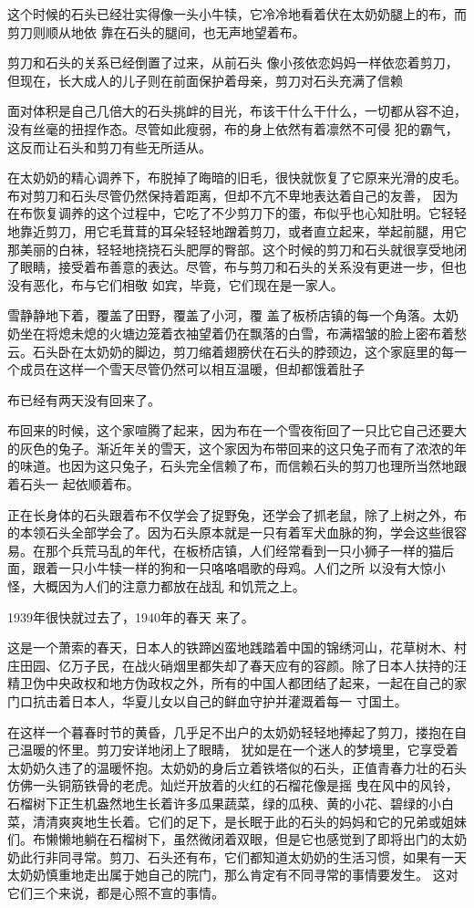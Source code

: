 \documentclass{article}
\begin{document}
这个时候的石头已经壮实得像一头小牛犊，它冷冷地看着伏在太奶奶腿上的布，而剪刀则顺从地依
靠在石头的腿间，也无声地望着布。 

剪刀和石头的关系已经倒置了过来，从前石头
\newpage
像小孩依恋妈妈一样依恋着剪刀，但现在，长大成人的儿子则在前面保护着母亲，剪刀对石头充满了信赖

面对体积是自己几倍大的石头挑衅的目光，布该干什么干什么，一切都从容不迫，没有丝毫的扭捏作态。尽管如此瘦弱，布的身上依然有着凛然不可侵
犯的霸气，这反而让石头和剪刀有些无所适从。 

在太奶奶的精心调养下，布脱掉了晦暗的旧毛，很快就恢复了它原来光滑的皮毛。布对剪刀和石头尽管仍然保持着距离，但却不亢不卑地表达着自己的友善， 因为在布恢复调养的这个过程中，它吃了不少剪刀下的蛋，布似乎也心知肚明。它轻轻地靠近剪刀，用它毛茸茸的耳朵轻轻地蹭着剪刀，或者直立起来，举起前腿，用它那美丽的白袜，轻轻地挠挠石头肥厚的臀部。这个时候的剪刀和石头就很享受地闭了眼睛，接受着布善意的表达。尽管，布与剪刀和石头的关系没有更进一步，但也没有恶化，布与它们相敬
如宾，毕竟，它们现在是一家人。 

雪静静地下着，覆盖了田野，覆盖了小河，覆
\newpage
盖了板桥店镇的每一个角落。太奶奶坐在将熄未熄的火塘边笼着衣袖望着仍在飘落的白雪，布满褶皱的脸上密布着愁云。石头卧在太奶奶的脚边，剪刀缩着翅膀伏在石头的脖颈边，这个家庭里的每一个成员在这样一个雪天尽管仍然可以相互温暖，但却都饿着肚子


布已经有两天没有回来了。 

布回来的时候，这个家喧腾了起来，因为布在一个雪夜衔回了一只比它自己还要大的灰色的兔子。渐近年关的雪天，这个家因为布带回来的这只兔子而有了浓浓的年的味道。也因为这只兔子，石头完全信赖了布，而信赖石头的剪刀也理所当然地跟着石头一
起依顺着布。 

正在长身体的石头跟着布不仅学会了捉野兔，还学会了抓老鼠，除了上树之外，布的本领石头全部学会了。因为石头原本就是一只有着军犬血脉的狗，学会这些很容易。在那个兵荒马乱的年代，在板桥店镇，人们经常看到一只小狮子一样的猫后面，跟着一只小牛犊一样的狗和一只咯咯唱歌的母鸡。人们之所
\newpage
以没有大惊小怪，大概因为人们的注意力都放在战乱
和饥荒之上。 

1939年很快就过去了，1940年的春天
来了。 


这是一个萧索的春天，日本人的铁蹄凶蛮地践踏着中国的锦绣河山，花草树木、村庄田园、亿万子民，在战火硝烟里都失却了春天应有的容颜。除了日本人扶持的汪精卫伪中央政权和地方伪政权之外，所有的中国人都团结了起来，一起在自己的家门口抗击着日本人，华夏儿女以自己的鲜血守护并灌溉着每一
寸国土。 

在这样一个暮春时节的黄昏，几乎足不出户的太奶奶轻轻地捧起了剪刀，搂抱在自己温暖的怀里。剪刀安详地闭上了眼睛， 犹如是在一个迷人的梦境里，它享受着太奶奶久违了的温暖怀抱。太奶奶的身后立着铁塔似的石头，正值青春力壮的石头仿佛一头铜筋铁骨的老虎。灿烂开放着的火红的石榴花像是摇
\newpage
曳在风中的风铃，石榴树下正生机盎然地生长着许多瓜果蔬菜，绿的瓜秧、黄的小花、碧绿的小白菜，清清爽爽地生长着。它们的足下，是长眠于此的石头的妈妈和它的兄弟或姐妹们。布懒懒地躺在石榴树下，虽然微闭着双眼，但是它也感觉到了即将出门的太奶奶此行非同寻常。剪刀、石头还有布，它们都知道太奶奶的生活习惯，如果有一天太奶奶慎重地走出属于她自己的院门，那么肯定有不同寻常的事情要发生。
这对它们三个来说，都是心照不宣的事情。 
\end{document}
